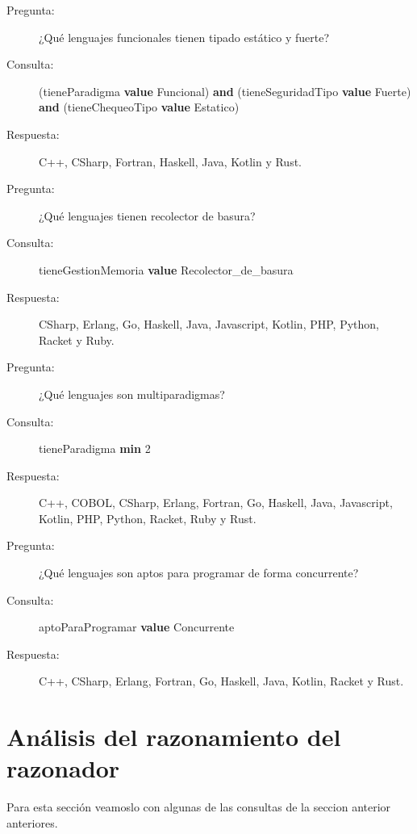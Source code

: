 \documentclass[12pt, titlepage, a4paper]{article}
\newcommand{\high}[2]{{\color{#1} \textbf{#2}}}
\begin{document}
\begin{description}
    \item[Pregunta:] ¿Qué lenguajes funcionales tienen tipado estático y fuerte?
    \item[Consulta:] (tieneParadigma \high{magenta}{value} Funcional) \high{cyan}{and} 
    (tieneSeguridadTipo \high{magenta}{value} Fuerte) \high{cyan}{and} 
    (tieneChequeoTipo \high{magenta}{value} Estatico)
    \item[Respuesta:] C++, CSharp, Fortran, Haskell, Java, Kotlin y Rust.\\
    
    \item[Pregunta:] ¿Qué lenguajes tienen recolector de basura?
    \item[Consulta:] tieneGestionMemoria \high{magenta}{value} Recolector\_de\_basura
    \item[Respuesta:] CSharp, Erlang, Go, Haskell, Java, Javascript, Kotlin, PHP, Python, Racket y Ruby.\\
    
    \item[Pregunta:] ¿Qué lenguajes son multiparadigmas?
    \item[Consulta:] tieneParadigma \high{magenta}{min} 2
    \item[Respuesta:] C++, COBOL, CSharp, Erlang, Fortran, Go, Haskell, Java, Javascript, Kotlin, PHP, Python, Racket, Ruby y Rust.\\
    
    \item[Pregunta:] ¿Qué lenguajes son aptos para programar de forma concurrente?
    \item[Consulta:] aptoParaProgramar \high{magenta}{value} Concurrente
    \item[Respuesta:] C++, CSharp, Erlang, Fortran, Go, Haskell, Java, Kotlin, Racket y Rust.\\
\end{description}

\section{Análisis del razonamiento del razonador}
Para esta sección veamoslo con algunas de las consultas de 
la seccion anterior anteriores.\\
\end{document}

